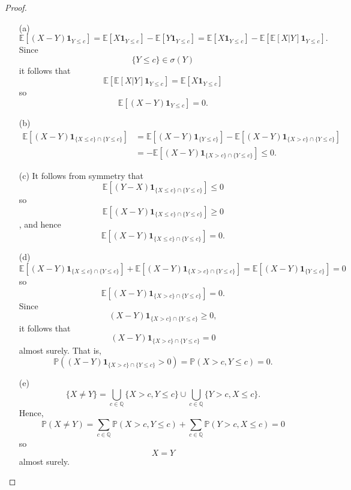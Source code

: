 \documentclass{article}
\begin{document}
\begin{proof}
\begin{enumerate}
    \item[(a)] \[\mathbb{E}[(X-Y)\mathbf{1}_{Y\leq c}]=\mathbb{E}[X\mathbf{1}_{Y\leq c}]-\mathbb{E}[Y\mathbf{1}_{Y\leq c}]=\mathbb{E}[X\mathbf{1}_{Y\leq c}]-\mathbb{E}[\mathbb{E}[X|Y]\mathbf{1}_{Y\leq c}].\]Since \[\{Y\leq c\}\in\sigma(Y)\] it follows that \[\mathbb{E}[\mathbb{E}[X|Y]\mathbf{1}_{Y\leq c}]=\mathbb{E}[X\mathbf{1}_{Y\leq c}]\] so \[\mathbb{E}[(X-Y)\mathbf{1}_{Y\leq c}]=0.\]
    \item[(b)] \begin{align*}
        \mathbb{E}[(X-Y)\mathbf{1}_{\{X\leq c\}\cap\{Y\leq c\}}]&=\mathbb{E}[(X-Y)\mathbf{1}_{\{Y\leq c\}}]-\mathbb{E}[(X-Y)\mathbf{1}_{\{X> c\}\cap\{Y\leq c\}}]\\&=-\mathbb{E}[(X-Y)\mathbf{1}_{\{X> c\}\cap\{Y\leq c\}}]\leq 0.
    \end{align*}
    \item[(c)] It follows from symmetry that \[\mathbb{E}[(Y-X)\mathbf{1}_{\{X\leq c\}\cap\{Y\leq c\}}]\leq0\] so \[\mathbb{E}[(X-Y)\mathbf{1}_{\{X\leq c\}\cap\{Y\leq c\}}]\geq 0\], and hence \[\mathbb{E}[(X-Y)\mathbf{1}_{\{X\leq c\}\cap\{Y\leq c\}}]=0.\]
    \item[(d)] \[\mathbb{E}[(X-Y)\mathbf{1}_{\{X\leq c\}\cap\{Y\leq c\}}]+\mathbb{E}[(X-Y)\mathbf{1}_{\{X>c\}\cap\{Y\leq c\}}]=\mathbb{E}[(X-Y)\mathbf{1}_{\{Y\leq c\}}]=0\]so\[\mathbb{E}[(X-Y)\mathbf{1}_{\{X>c\}\cap\{Y\leq c\}}]=0.\]Since\[(X-Y)\mathbf{1}_{\{X>c\}\cap\{Y\leq c\}}\geq0,\] it follows that \[(X-Y)\mathbf{1}_{\{X>c\}\cap\{Y\leq c\}}=0\] almost surely. That is,\[\mathbb{P}((X-Y)\mathbf{1}_{\{X>c\}\cap\{Y\leq c\}}>0)=\mathbb{P}(X>c,Y\leq c)=0.\]
    \item[(e)] \[\{X\neq Y\}=\bigcup_{c\in \mathbb{Q}}\{X>c,Y\leq c\}\cup\bigcup_{c\in\mathbb{Q}}\{Y>c,X\leq c\}.\]Hence,\[\mathbb{P}(X\neq Y)=\sum_{c\in\mathbb{Q}}\mathbb{P}(X>c,Y\leq c)+\sum_{c\in\mathbb{Q}}\mathbb{P}(Y>c,X\leq c)=0\] so\[X=Y\] almost surely.
\end{enumerate}
\end{proof}
\end{document}
